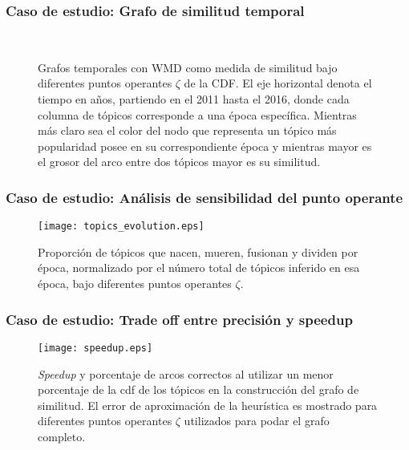 \documentclass[
	spanish, %
	aspectratio=43, %
	hyperref={pdfencoding=auto,psdextra},
	xcolor={dvipsnames,table,usenames},
]{beamer}
\begin{document}
\begin{frame}[t]
\frametitle{Caso de estudio: Grafo de similitud temporal}

\vspace*{-0.2in}
\begin{figure}
\\
\caption{Grafos temporales con WMD como medida de similitud bajo diferentes puntos operantes $\zeta$ de la CDF. El eje horizontal denota el tiempo en años, partiendo en el 2011 hasta el 2016, donde cada columna de tópicos corresponde a una época específica. Mientras más claro sea el color del nodo que representa un tópico más popularidad posee en su correspondiente época y mientras mayor es el grosor del arco entre dos tópicos mayor es su similitud.}
\label{img:temporal_similarity_graphs}
\end{figure}

\end{frame}


\begin{frame}[t]
\frametitle{Caso de estudio: Análisis de sensibilidad del punto operante}
\begin{figure}

\vspace*{-0.2in}
\texttt{[image: topics\_evolution.eps]}
\caption{Proporción de tópicos que nacen, mueren, fusionan y dividen por época, normalizado por el número total de tópicos inferido en esa época, bajo diferentes puntos operantes $\zeta$.}
\label{img:topics_evolution}
\end{figure}

\end{frame}


\begin{frame}[t]
\frametitle{Caso de estudio: Trade off entre precisión y speedup}
\vspace*{-0.2in}
\begin{figure}
\texttt{[image: speedup.eps]}
\caption{\textit{Speedup} y porcentaje de arcos correctos al utilizar un menor porcentaje de la cdf de los tópicos en la construcción del grafo de similitud. El error de aproximación de la heurística es mostrado para diferentes puntos operantes $\zeta$ utilizados para podar el grafo completo.} 
\label{img:speedup}
\end{figure}

\end{frame}
\end{document}
